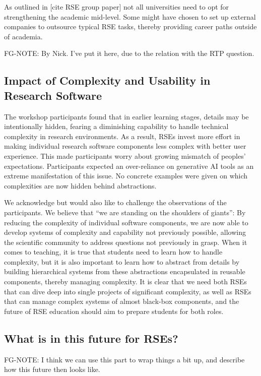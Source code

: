 \documentclass{eceasst}
\begin{document}
As outlined in [cite RSE group paper] not all universities need to opt for strengthening
the academic mid-level. Some might have chosen to set up external companies to outsource typical RSE tasks,
thereby providing career paths outside of academia.

FG-NOTE: By Nick. I've put it here, due to the relation with the RTP question.

\subsection{Impact of Complexity and Usability in Research Software}

The workshop participants found that in earlier learning stages,
details may be intentionally hidden,
fearing a diminishing capability to handle technical complexity in research environments.
As a result, RSEs invest more effort in making individual research software components
less complex with better user experience.
This made participants worry about growing mismatch of peoples' expectations.
Participants expected an over-reliance on generative AI tools as an extreme manifestation of this issue.
No concrete examples were given on which complexities are now hidden behind abstractions.

We acknowledge but would also like to challenge the observations of the participants.
We believe that ``we are standing on the shoulders of giants'':
By reducing the complexity of individual software components,
we are now able to develop systems of complexity and capability not previously possible,
allowing the scientific community to address questions not previously in grasp.
When it comes to teaching, it is true that students need to learn how to handle complexity,
but it is also important to learn how to abstract from details
by building hierarchical systems from these abstractions encapsulated in reusable components, thereby managing complexity.
It is clear that we need both RSEs that can dive deep into single projects of significant complexity,
as well as RSEs that can manage complex systems of almost black-box components,
and the future of RSE education should aim to prepare students for both roles.


\subsection{What is in this future for RSEs?}
FG-NOTE: I think we can use this part to wrap things a bit up, and describe how this future then looks like.
\end{document}
